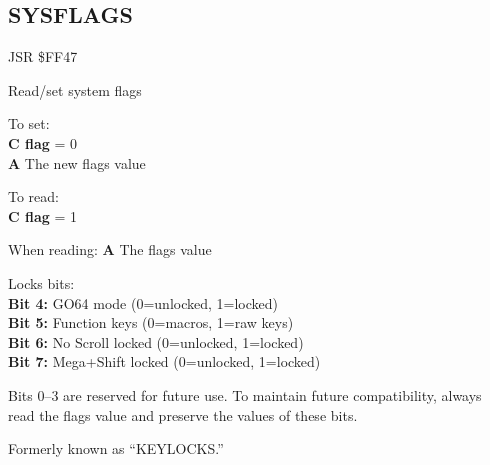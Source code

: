
\newpage
\subsection{SYSFLAGS}
\label{KERNAL Jump Table!SYSFLAGS}
\begin{description}[leftmargin=2cm,style=nextline]
    \item [Address:] JSR \$FF47
    \item [Description:] Read/set system flags
    \item [Inputs:]
        To set: \\
        \textbf{C flag} = 0 \\
        \textbf{A} The new flags value

        To read: \\
        \textbf{C flag} = 1
    \item [Outputs:]
        When reading:
        \textbf{A} The flags value
    \item [Remarks:]
        Locks bits: \\
        \textbf{Bit 4:} GO64 mode (0=unlocked, 1=locked) \\
        \textbf{Bit 5:} Function keys (0=macros, 1=raw keys) \\
        \textbf{Bit 6:} No Scroll locked (0=unlocked, 1=locked) \\
        \textbf{Bit 7:} Mega+Shift locked (0=unlocked, 1=locked)

        Bits 0--3 are reserved for future use. To maintain future compatibility, always read the flags value and preserve the values of these bits.

        Formerly known as ``KEYLOCKS.''

    \item [Example:]

\end{description}



\newpage
